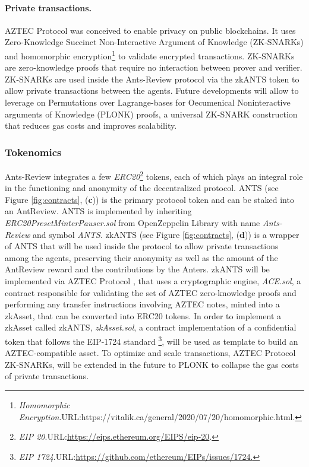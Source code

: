 \documentclass[runningheads]{llncs}
\begin{document}
\paragraph{Private transactions.}AZTEC Protocol  was conceived to enable privacy on public blockchains. It uses Zero-Knowledge Succinct Non-Interactive Argument of Knowledge (ZK-SNARKs)\cite{ZKSNARKs} and homomorphic encryption\footnote[11]{\emph{Homomorphic Encryption}.\textsc{URL:}https://vitalik.ca/general/2020/07/20/homomorphic.html.} to validate encrypted transactions.
\newline ZK-SNARKs are zero-knowledge proofs that require no interaction between prover and verifier. ZK-SNARKs are used inside the Ants-Review protocol via the zkANTS token to allow private transactions between the agents.
\newline Future developments will allow to leverage on Permutations over Lagrange-bases for Oecumenical Noninteractive arguments of Knowledge (PLONK) \cite{PLONK}proofs, a universal ZK-SNARK construction that reduces gas costs and improves scalability.

\subsubsection{Tokenomics}
Ants-Review integrates a few \emph{ERC20}\footnote[12]{\emph{EIP 20}.\textsc{URL:}\url{https://eips.ethereum.org/EIPS/eip-20}.} tokens, each of which plays an integral role in the functioning and anonymity of the decentralized protocol.
\newline ANTS (see Figure \ref{fig:contracts}, (\textbf{c})) is the primary protocol token and can be staked into an AntReview.
\newline ANTS is implemented by inheriting \emph{ERC20PresetMinterPauser.sol} from OpenZeppelin Library with name \emph{Ants-Review} and symbol \emph{ANTS}.
\newline zkANTS (see Figure \ref{fig:contracts}, (\textbf{d})) is a wrapper of ANTS that will be used inside the protocol to allow private transactions among the agents, preserving their anonymity as well as the amount of the AntReview reward and the contributions by the Anters. zkANTS will be implemented via AZTEC Protocol \cite{AZTEC}, that uses a cryptographic engine, \emph{ACE.sol}, a contract responsible for validating the set of AZTEC zero-knowledge proofs and performing any transfer instructions involving AZTEC notes, minted into a zkAsset, that can be converted into ERC20 tokens. In order to implement a zkAsset called zkANTS, \emph{zkAsset.sol}, a contract implementation of a confidential token that follows the EIP-1724 standard \footnote[13]{\emph{EIP  1724}.\textsc{URL:}\url{https://github.com/ethereum/EIPs/issues/1724.}}, will be used as template to build an AZTEC-compatible asset.
\newline To optimize and scale transactions, AZTEC Protocol ZK-SNARKs, will be extended in the future to PLONK \cite{PLONK} to collapse the gas costs of private transactions.
\end{document}
